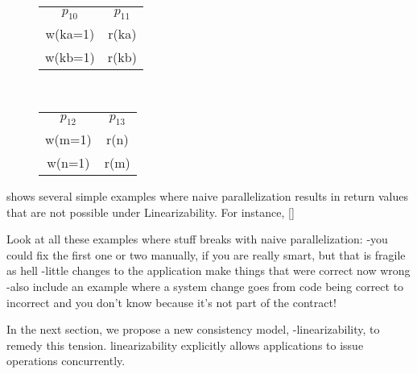 \begin{figure*}
\begin{subfigure}[t]{.2\linewidth}
\begin{center}
\begin{tabular}{ c c }
 $p_{10}$ & $p_{11}$ \\
 w(ka=1) & r(ka) \\  
 w(kb=1) & r(kb)    
\end{tabular}
\caption{}
\label{subfig:resharding_breaks}
\end{center}
\end{subfigure}
~
\begin{subfigure}[t]{.2\linewidth}
\begin{center}
\begin{tabular}{ c c }
 $p_{12}$ & $p_{13}$ \\
 w(m=1) & r(n) \\  
 w(n=1) & r(m)    
\end{tabular}
\caption{}
\end{center}
\end{subfigure}
\caption{}
\label{subfig:suffix_closed_breaks}
\label{fig:naive_breaks_stuff}
\end{figure*}

 shows several simple examples where naive parallelization results in return values that are not possible under Linearizability. For instance, \cref{}

Look at all these examples where stuff breaks with naive parallelization:
-you could fix the first one or two manually, if you are really smart, but that is fragile as hell
-little changes to the application make things that were correct now wrong
-also include an example where a system change goes from code being correct to incorrect and you don't know because it's not part of the contract!



In the next section, we propose a new \multidispatch{} 
consistency model, \md{}-linearizability, to remedy this 
tension. \Multidispatch{} linearizability explicitly allows 
applications to issue operations concurrently.

